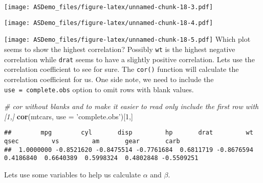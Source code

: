\documentclass[]{book}
\newenvironment{Shaded}{\begin{snugshade}}{\end{snugshade}}
\newcommand{\KeywordTok}[1]{\textcolor[rgb]{0.13,0.29,0.53}{\textbf{#1}}}
\newcommand{\DataTypeTok}[1]{\textcolor[rgb]{0.13,0.29,0.53}{#1}}
\newcommand{\DecValTok}[1]{\textcolor[rgb]{0.00,0.00,0.81}{#1}}
\newcommand{\StringTok}[1]{\textcolor[rgb]{0.31,0.60,0.02}{#1}}
\newcommand{\CommentTok}[1]{\textcolor[rgb]{0.56,0.35,0.01}{\textit{#1}}}
\newcommand{\OperatorTok}[1]{\textcolor[rgb]{0.81,0.36,0.00}{\textbf{#1}}}
\newcommand{\NormalTok}[1]{#1}
\begin{document}
\texttt{[image: ASDemo\_files/figure-latex/unnamed-chunk-18-3.pdf]}

\begin{Shaded}
\end{Shaded}

\texttt{[image: ASDemo\_files/figure-latex/unnamed-chunk-18-4.pdf]}

\begin{Shaded}
\end{Shaded}

\texttt{[image: ASDemo\_files/figure-latex/unnamed-chunk-18-5.pdf]} Which
plot seems to show the highest correlation? Possibly \texttt{wt} is the
highest negative correlation while \texttt{drat} seems to have a
slightly positive correlation. Lets use the correlation coefficient to
see for sure. The \texttt{cor()} function will calculate the correlation
coefficient for us. One side note, we need to include the
\texttt{use\ =\ \textquotesingle{}complete.obs\textquotesingle{}} option
to omit rows with blank values.

\begin{Shaded}
\begin{Highlighting}[]
\CommentTok{# cor without blanks and to make it easier to read only include the first row with [1,]}
\KeywordTok{cor}\NormalTok{(mtcars, }\DataTypeTok{use =} \StringTok{'complete.obs'}\NormalTok{)[}\DecValTok{1}\NormalTok{,]}
\end{Highlighting}
\end{Shaded}

\begin{verbatim}
##        mpg        cyl       disp         hp       drat         wt       qsec         vs         am       gear       carb 
##  1.0000000 -0.8521620 -0.8475514 -0.7761684  0.6811719 -0.8676594  0.4186840  0.6640389  0.5998324  0.4802848 -0.5509251
\end{verbatim}

Lets use some variables to help us calculate \(\alpha\) and \(\beta\).
\end{document}
